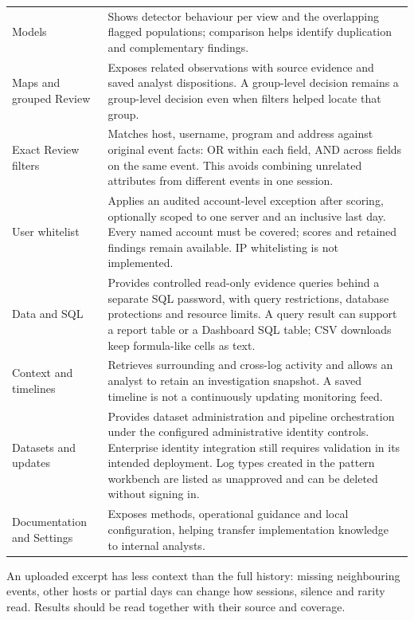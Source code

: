 \documentclass[11pt,a4paper]{article}
\begin{document}
\begin{longtable}{>{\RaggedRight\arraybackslash}p{}>{\RaggedRight\arraybackslash}p{}}
Models & Shows detector behaviour per view and the overlapping flagged populations; comparison helps identify duplication and complementary findings. \\[3pt]
Maps and grouped Review & Exposes related observations with source evidence and saved analyst dispositions. A group-level decision remains a group-level decision even when filters helped locate that group. \\[3pt]
Exact Review filters & Matches host, username, program and address against original event facts: OR within each field, AND across fields on the same event. This avoids combining unrelated attributes from different events in one session. \\[3pt]
User whitelist & Applies an audited account-level exception after scoring, optionally scoped to one server and an inclusive last day. Every named account must be covered; scores and retained findings remain available. IP whitelisting is not implemented. \\[3pt]
Data and SQL & Provides controlled read-only evidence queries behind a separate SQL password, with query restrictions, database protections and resource limits. A query result can support a report table or a Dashboard SQL table; CSV downloads keep formula-like cells as text. \\[3pt]
Context and timelines & Retrieves surrounding and cross-log activity and allows an analyst to retain an investigation snapshot. A saved timeline is not a continuously updating monitoring feed. \\[3pt]
Datasets and updates & Provides dataset administration and pipeline orchestration under the configured administrative identity controls. Enterprise identity integration still requires validation in its intended deployment. Log types created in the pattern workbench are listed as unapproved and can be deleted without signing in. \\[3pt]
Documentation and Settings & Exposes methods, operational guidance and local configuration, helping transfer implementation knowledge to internal analysts. \\[3pt]
\end{longtable}
\endgroup


An uploaded excerpt has less context than the full history: missing neighbouring events, other hosts or partial days can change how sessions, silence and rarity read. Results should be read together with their source and coverage.
\end{document}
